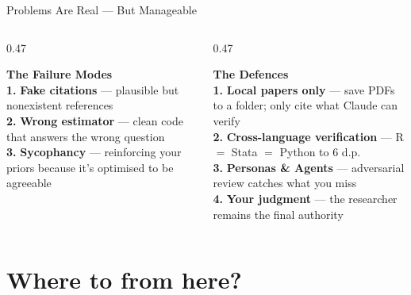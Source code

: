 \documentclass[aspectratio=169, 11pt]{beamer}
\newcommand{\emphgold}[1]{\alert{\textbf{#1}}}
\begin{document}
\begin{frame}{Problems Are Real --- But Manageable}
\begin{columns}[T]
\begin{column}{0.47\textwidth}
  \begin{tcolorbox}[
    enhanced, colback=red!5, colframe=red!30, boxrule=0.5pt,
    sharp corners, left=8pt, right=8pt, top=6pt, bottom=6pt,
  ]
    {\normalsize\bfseries\color{coral} The Failure Modes}\\[6pt]
    {\small \emphgold{1.} \textbf{Fake citations} --- plausible but nonexistent references}\\[4pt]
    {\small \emphgold{2.} \textbf{Wrong estimator} --- clean code that answers the wrong question}\\[4pt]
    {\small \emphgold{3.} \textbf{Sycophancy} --- reinforcing your priors because it's optimised to be agreeable}
  \end{tcolorbox}
\end{column}
\begin{column}{0.47\textwidth}
  \begin{tcolorbox}[
    enhanced, colback=green!5, colframe=green!30!black, boxrule=0.5pt,
    sharp corners, left=8pt, right=8pt, top=6pt, bottom=6pt,
  ]
    {\normalsize\bfseries\color{sage} The Defences}\\[6pt]
    {\small \emphgold{1.} \textbf{Local papers only} --- save PDFs to a folder; only cite what Claude can verify}\\[4pt]
    {\small \emphgold{2.} \textbf{Cross-language verification} --- R $=$ Stata $=$ Python to 6 d.p.}\\[4pt]
    {\small \emphgold{3.} \textbf{Personas \& Agents} --- adversarial review catches what you miss}\\[4pt]
    {\small \emphgold{4.} \textbf{Your judgment} --- the researcher remains the final authority}
  \end{tcolorbox}
\end{column}
\end{columns}
\end{frame}



\section{Where to from here?}
\end{document}
